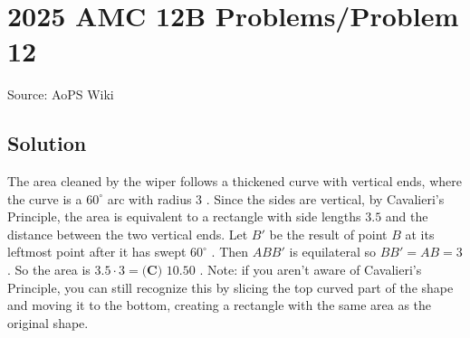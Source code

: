 \documentclass[12pt]{article}
\begin{document}
\section*{{2025 AMC 12B Problems/Problem 12}}
Source: AoPS Wiki

\subsection*{Solution}
The area cleaned by the wiper follows a thickened curve with vertical ends, where the curve is a $60^\circ$ arc with radius $3$ . Since the sides are vertical, by Cavalieri's Principle, the area is equivalent to a rectangle with side lengths $3.5$ and the distance between the two vertical ends. Let $B'$ be the result of point $B$ at its leftmost point after it has swept $60^\circ$ . Then $ABB'$ is equilateral so $BB' = AB = 3$ . So the area is $3.5 \cdot 3 = \boxed{\textbf{(C) } 10.50}$ . Note: if you aren't aware of Cavalieri's Principle, you can still recognize this by slicing the top curved part of the shape and moving it to the bottom, creating a rectangle with the same area as the original shape.
\end{document}
